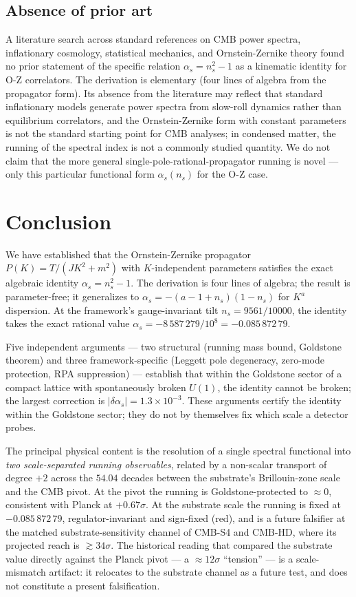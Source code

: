 \documentclass[12pt]{article}
\theoremstyle{definition}
\theoremstyle{remark}
\begin{document}
\subsection{Absence of prior art}

A literature search across standard references on CMB power spectra, inflationary cosmology, statistical mechanics, and Ornstein-Zernike theory found no prior statement of the specific relation $\alpha_s = n_s^2 - 1$ as a kinematic identity for O-Z correlators. The derivation is elementary (four lines of algebra from the propagator form). Its absence from the literature may reflect that standard inflationary models generate power spectra from slow-roll dynamics rather than equilibrium correlators, and the Ornstein-Zernike form with constant parameters is not the standard starting point for CMB analyses; in condensed matter, the running of the spectral index is not a commonly studied quantity. We do not claim that the more general single-pole-rational-propagator running is novel --- only this particular functional form $\alpha_s(n_s)$ for the O-Z case.

\section{Conclusion}

We have established that the Ornstein-Zernike propagator $P(K) = T/(JK^2 + m^2)$ with $K$-independent parameters satisfies the exact algebraic identity $\alpha_s = n_s^2 - 1$. The derivation is four lines of algebra; the result is parameter-free; it generalizes to $\alpha_s = -(a-1+n_s)(1-n_s)$ for $K^a$ dispersion. At the framework's gauge-invariant tilt $n_s = 9561/10000$, the identity takes the exact rational value $\alpha_s = -8\,587\,279/10^8 = -0.085\,872\,79$.

Five independent arguments --- two structural (running mass bound, Goldstone theorem) and three framework-specific (Leggett pole degeneracy, zero-mode protection, RPA suppression) --- establish that within the Goldstone sector of a compact lattice with spontaneously broken $U(1)$, the identity cannot be broken; the largest correction is $|\delta\alpha_s| = 1.3 \times 10^{-3}$. These arguments certify the identity within the Goldstone sector; they do not by themselves fix which scale a detector probes.

The principal physical content is the resolution of a single spectral functional into \emph{two scale-separated running observables}, related by a non-scalar transport of degree $+2$ across the $54.04$ decades between the substrate's Brillouin-zone scale and the CMB pivot. At the pivot the running is Goldstone-protected to $\approx 0$, consistent with Planck at $+0.67\sigma$. At the substrate scale the running is fixed at $-0.085\,872\,79$, regulator-invariant and sign-fixed (red), and is a future falsifier at the matched substrate-sensitivity channel of CMB-S4 and CMB-HD, where its projected reach is $\gtrsim 34\sigma$. The historical reading that compared the substrate value directly against the Planck pivot --- a $\approx 12\sigma$ ``tension'' --- is a scale-mismatch artifact: it relocates to the substrate channel as a future test, and does not constitute a present falsification.
\end{document}
